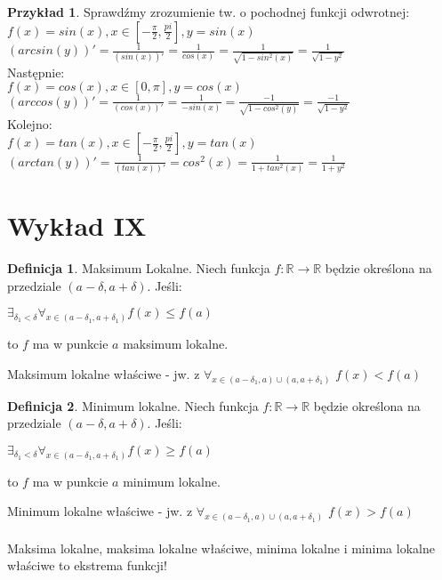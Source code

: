 \documentclass{article}
\theoremstyle{definition}
\newtheorem{de}{Definicja}[subsection]
\theoremstyle{definition}
\theoremstyle{definition}
\newtheorem{pk}{Przykład}[subsection]
\theoremstyle{definition}
\begin{document}
\begin{pk}
    Sprawdźmy zrozumienie tw. o pochodnej funkcji odwrotnej:\\
    $f(x)=sin(x), x\in[-\frac{\pi}{2},\frac{pi}{2}], y=sin(x)$\\
    $\left(arcsin(y)\right)'=\frac{1}{(sin(x))'} = \frac{1}{cos(x)}=\frac{1}{\sqrt{1-sin^2(x)}}=\frac{1}{\sqrt{1-y^2}}$\\
    Następnie:\\
    $f(x)=cos(x), x\in[0,\pi], y=cos(x)$\\
    $\left(arccos(y)\right)'=\frac{1}{(cos(x))'} = \frac{1}{-sin(x)} = \frac{-1}{\sqrt{1-cos^2(y)}}=\frac{-1}{\sqrt{1-y^2}}$\\
    Kolejno:\\
    $f(x)=tan(x), x\in[-\frac{\pi}{2},\frac{pi}{2}], y=tan(x)$\\
    $\left(arctan(y)\right)'=\frac{1}{(tan(x))'}=cos^2(x)=\frac{1}{1+tan^2(x)}=\frac{1}{1+y^2}$
\end{pk}

\section{Wykład IX}

\begin{de}
Maksimum Lokalne. Niech funkcja $f:\mathbb{R}\rightarrow\mathbb{R}$ będzie określona na przedziale $(a-\delta,a+\delta)$.
Jeśli:
\begin{center}
    $\exists_{\delta_1 < \delta} \forall_{x\in(a-\delta_1,a + \delta_1)} f(x)\leq f(a)$
\end{center} to $f$  ma w punkcie $a$ maksimum lokalne.
\end{de}
Maksimum lokalne właściwe - jw. z $\forall_{x\in (a-\delta_1, a)\cup(a,a+\delta_1)}$ $f(x)<f(a)$

\begin{de}
Minimum lokalne. Niech funkcja $f:\mathbb{R}\rightarrow\mathbb{R}$ będzie określona na przedziale $(a-\delta,a+\delta)$.
Jeśli:
\begin{center}
    $\exists_{\delta_1 < \delta} \forall_{x\in(a-\delta_1,a + \delta_1)} f(x)\geq f(a)$
\end{center} to $f$  ma w punkcie $a$ minimum lokalne.
\end{de}
Minimum lokalne właściwe - jw. z $\forall_{x\in (a-\delta_1, a)\cup(a,a+\delta_1)}$ $f(x)>f(a)$\\\\
Maksima lokalne, maksima lokalne właściwe, minima lokalne i minima lokalne właściwe to ekstrema funkcji!
\end{document}
